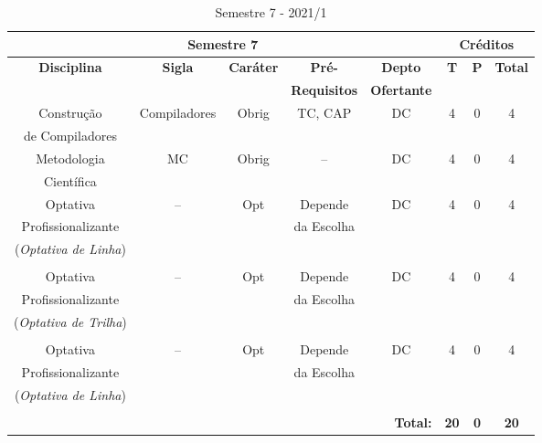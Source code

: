
\begin{table}[H]
\caption{Semestre 7  - 2021/1}
\centering
\footnotesize
\begin{tabular}{|c|c|c|c|c|c|c|c|} %
\hline
\hline
\multicolumn{5}{|c|}{\textbf{Semestre 7}}  &  \multicolumn{3}{|c|}{\textbf{Créditos}} \\
\hline
\hline
\textbf{Disciplina} & \textbf{Sigla} & \textbf{Caráter} & \textbf{Pré-} & \textbf{Depto} &  \textbf{T}  &  \textbf{P}  & \textbf{Total} \\ 
& & & \textbf{Requisitos}  & \textbf{Ofertante} & & & \\
\hline 

Construção & Compiladores & Obrig & TC, 
CAP & DC & 4 & 0 & 4 \\
de Compiladores & & & & & & &  \\
\hline


Metodologia & MC & Obrig & -- & DC & 4 & 0 & 4 \\
Científica & & & & & & &  \\
\hline

Optativa & --  & Opt & Depende & DC  & 4 & 0 & 4 \\
Profissionalizante & & & da Escolha & & & & \\
(\textit{Optativa de Linha}) & & & & & & & \\
 & & & & & & & \\
\hline

Optativa & --  & Opt & Depende & DC  & 4 & 0 & 4 \\
Profissionalizante & & & da Escolha & & & & \\
(\textit{Optativa de Trilha}) & & & & & & & \\
 & & & & & & & \\
\hline


Optativa & --  & Opt & Depende & DC  & 4 & 0 & 4 \\
Profissionalizante & & & da Escolha & & & & \\
(\textit{Optativa de Linha}) & & & & & & & \\
 & & & & & & & \\
\hline

\hline


\hline
\hline
\multicolumn{5}{|r|}{\textbf{Total:}}  &  \textbf{20}  &  \textbf{0}   & \textbf{20} \\ %
\hline
\hline
\end{tabular}
\label{tab:matriz7m}
\end{table}


